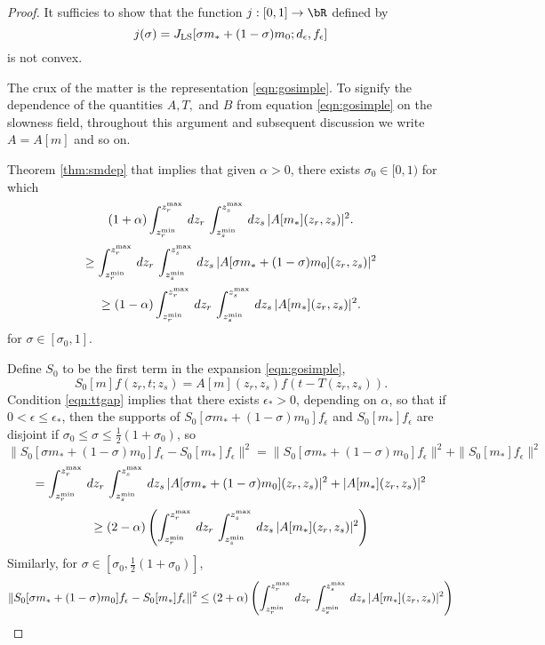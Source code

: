 \begin{proof}
It sufficies to show that the function $j:[0,1] \rightarrow \bR$ defined by 
\[
j(\sigma) = J_{\rm LS}[\sigma m_* + (1-\sigma)m_0;d_{\epsilon},f_{\epsilon}]
\]
is not convex.

The crux of the matter is the representation \ref{eqn:gosimple}. To signify the dependence of the quantities $A, T,$ and $B$ from
equation \ref{eqn:gosimple} on the slowness field, throughout this
argument and subsequent discussion we write $A=A[m]$ and so on.

Theorem \ref{thm:smdep} that implies that given $\alpha>0$, there
exists $\sigma_0 \in [0,1)$ for which 
\[
(1+\alpha) \int_{z_r^{\rm min}}^{z_r^{\rm max}}\,dz_r\, \int_{z_s^{\rm
    min}}^{z_s^{\rm max}}\,dz_s\,|A[m_*](z_r,z_s)|^2.
\]
\[
\ge \int_{z_r^{\rm min}}^{z_r^{\rm max}}\,dz_r\, \int_{z_s^{\rm
    min}}^{z_s^{\rm max}}\,dz_s\,|A[\sigma m_* +
(1-\sigma)m_0](z_r,z_s)|^2 
\]
\[
\ge (1-\alpha) \int_{z_r^{\rm min}}^{z_r^{\rm max}}\,dz_r\, \int_{z_s^{\rm
    min}}^{z_s^{\rm max}}\,dz_s\,|A[m_*](z_r,z_s)|^2.
\]
for $\sigma \in [\sigma_0,1]$.

Define $S_0$ to be the first term in the expansion \ref{eqn:gosimple},
\[
S_0[m]f(z_r,t;z_s) = A[m](z_r,z_s)f(t-T(z_r,z_s)).
\]
Condition \ref{eqn:ttgap} implies that there exists $\epsilon_*>0$,
depending on $\alpha$, so that if $0 <\epsilon\le \epsilon_*$, then the supports of $S_0[\sigma m_* + (1-\sigma)m_0]f_{\epsilon}$ and
$S_0[m_*]f_{\epsilon}$ are disjoint if $\sigma_0 \le \sigma \le \frac{1}{2}(1+\sigma_0)$, so
\[
\|S_0[\sigma m_* + (1-\sigma)m_0]f_{\epsilon}-S_0[m_*]f_{\epsilon}\|^2 =
\|S_0[\sigma m_* + (1-\sigma)m_0]f_{\epsilon}\|^2 + \|S_0[m_*]f_{\epsilon}\|^2 
\]
\[
= \int_{z_r^{\rm min}}^{z_r^{\rm max}}\,dz_r\, \int_{z_s^{\rm
    min}}^{z_s^{\rm max}}\,dz_s\,|A[\sigma m_* + (1-\sigma)m_0](z_r,z_s)|^2 +
|A[m_*](z_r,z_s)|^2 
\]
\begin{equation}
\label{eqn:orthominus}
\ge (2-\alpha)\left(\int_{z_r^{\rm min}}^{z_r^{\rm max}}\,dz_r\, \int_{z_s^{\rm
    min}}^{z_s^{\rm max}}\,dz_s\,|A[m_*](z_r,z_s)|^2\right) 
\end{equation}
Similarly, for $\sigma \in [\sigma_0, \frac{1}{2}(1+\sigma_0)]$,
\begin{equation}
\label{eqn:orthoplus}
\|S_0[\sigma m_* + (1-\sigma)m_0]f_{\epsilon}-S_0[m_*]f_{\epsilon}\|^2 
\le (2+\alpha)\left(\int_{z_r^{\rm min}}^{z_r^{\rm max}}\,dz_r\, \int_{z_s^{\rm
    min}}^{z_s^{\rm max}}\,dz_s\,|A[m_*](z_r,z_s)|^2\right) 
\end{equation}


\end{proof}

